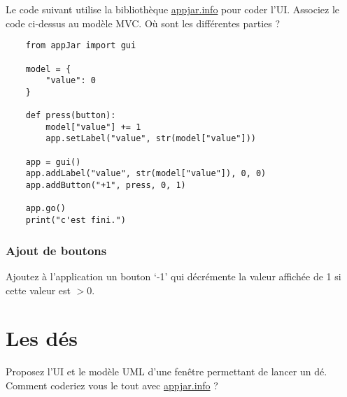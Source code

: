 \documentclass[12pt]{article}
\begin{document}
    Le code suivant utilise la bibliothèque \url{appjar.info} pour coder l'UI. Associez le code ci-dessus au modèle MVC. Où sont les différentes parties ? 
    
    \lstset{language=Python}
    \begin{lstlisting}
    from appJar import gui
    
    model = {
        "value": 0
    }
    
    def press(button):
        model["value"] += 1
        app.setLabel("value", str(model["value"]))
    
    app = gui()
    app.addLabel("value", str(model["value"]), 0, 0)
    app.addButton("+1", press, 0, 1)
    
    app.go()
    print("c'est fini.")
    \end{lstlisting}
    
    
    
    
    \subsubsection{Ajout de boutons}
    
    Ajoutez à  l'application un bouton `-1' qui décrémente la valeur affichée de 1 si cette valeur est $>0$.
    
    \section{Les dés}
    
    Proposez l'UI et le modèle UML d'une fenêtre permettant de lancer un dé. Comment coderiez vous le tout avec \url{appjar.info} ?
    
    
\end{document}
